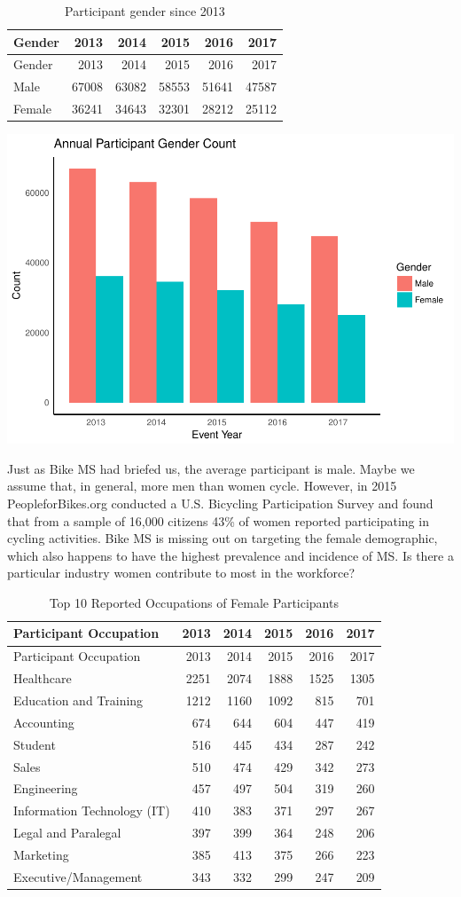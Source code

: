 \documentclass[]{article}
\begin{document}
\begin{longtable}[]{@{}lrrrrr@{}}
\caption{Participant gender since 2013}\tabularnewline
\toprule
Gender & 2013 & 2014 & 2015 & 2016 & 2017\tabularnewline
\midrule
\endfirsthead
\toprule
Gender & 2013 & 2014 & 2015 & 2016 & 2017\tabularnewline
\midrule
\endhead
Male & 67008 & 63082 & 58553 & 51641 & 47587\tabularnewline
Female & 36241 & 34643 & 32301 & 28212 & 25112\tabularnewline
\bottomrule
\end{longtable}

\includegraphics{index_files/figure-latex/gender.sum-1.pdf}

Just as Bike MS had briefed us, the average participant is male. Maybe
we assume that, in general, more men than women cycle. However, in 2015
PeopleforBikes.org conducted a U.S. Bicycling Participation Survey and
found that from a sample of 16,000 citizens 43\% of women reported
participating in cycling activities. Bike MS is missing out on targeting
the female demographic, which also happens to have the highest
prevalence and incidence of MS. Is there a particular industry women
contribute to most in the workforce?

\begin{longtable}[]{@{}lrrrrr@{}}
\caption{Top 10 Reported Occupations of Female
Participants}\tabularnewline
\toprule
Participant Occupation & 2013 & 2014 & 2015 & 2016 & 2017\tabularnewline
\midrule
\endfirsthead
\toprule
Participant Occupation & 2013 & 2014 & 2015 & 2016 & 2017\tabularnewline
\midrule
\endhead
Healthcare & 2251 & 2074 & 1888 & 1525 & 1305\tabularnewline
Education and Training & 1212 & 1160 & 1092 & 815 & 701\tabularnewline
Accounting & 674 & 644 & 604 & 447 & 419\tabularnewline
Student & 516 & 445 & 434 & 287 & 242\tabularnewline
Sales & 510 & 474 & 429 & 342 & 273\tabularnewline
Engineering & 457 & 497 & 504 & 319 & 260\tabularnewline
Information Technology (IT) & 410 & 383 & 371 & 297 & 267\tabularnewline
Legal and Paralegal & 397 & 399 & 364 & 248 & 206\tabularnewline
Marketing & 385 & 413 & 375 & 266 & 223\tabularnewline
Executive/Management & 343 & 332 & 299 & 247 & 209\tabularnewline
\bottomrule
\end{longtable}
\end{document}
